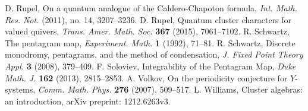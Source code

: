 \documentclass{amsart}
\theoremstyle{definition}
\theoremstyle{remark}
\numberwithin{equation}{section}
\begin{document}
\begin{thebibliography}{99}
   D. Rupel, On a quantum analogue of the Caldero-Chapoton formula, \textsl{Int. Math. Res. Not.} (2011), no. 14, 3207--3236.
   D. Rupel, Quantum cluster characters for valued quivers, \textsl{Trans. Amer. Math. Soc.} \textbf{367} (2015), 7061--7102.
	 R. Schwartz, The pentagram map, \textsl{Experiment. Math.} \textbf{1} (1992), 71--81.
	 R. Schwartz, Discrete monodromy, pentagrams, and the method of condensation, \textsl{J. Fixed Point Theory Appl.} \textbf{3} (2008), 379--409.
	 F. Soloviev, Integrability of the Pentagram Map, \textsl{Duke Math. J.} \textbf{162} (2013), 2815--2853.
	 A. Volkov, On the periodicity conjecture for $Y$-systems, \textsl{Comm. Math. Phys.} \textbf{276} (2007), 509--517.
   L. Williams, Cluster algebras: an introduction, arXiv preprint: 1212.6263v3.
\end{thebibliography}
\end{document}
